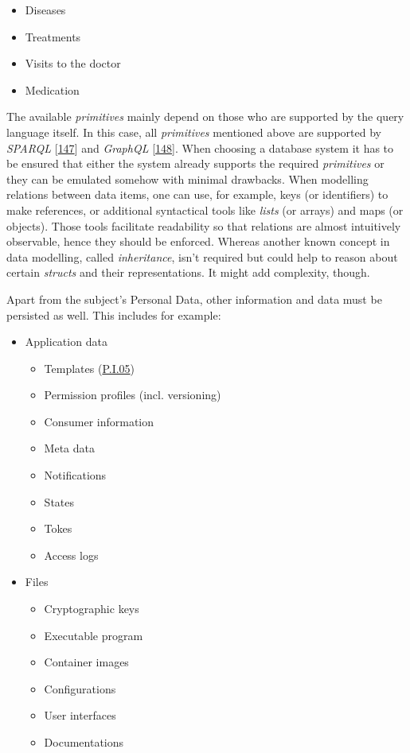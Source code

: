 \documentclass[12pt,english,a4paper,titlepage,cleardoublepage=empty,dottedtoc]{report}
\providecommand{\tightlist}{%
  \setlength{\itemsep}{0pt}\setlength{\parskip}{0pt}}
\begin{document}
\begin{itemize}
  \begin{itemize}
  \tightlist
  \item
    Diseases
  \item
    Treatments
  \item
    Visits to the doctor
  \item
    Medication
  \end{itemize}
\end{itemize}

The available \emph{primitives} mainly depend on those who are supported
by the query language itself. In this case, all \emph{primitives}
mentioned above are supported by \emph{SPARQL}
{[}\protect\hyperlink{ref-web_spec_xml_types}{147}{]} and \emph{GraphQL}
{[}\protect\hyperlink{ref-web_spec_graphql_types}{148}{]}. When choosing
a database system it has to be ensured that either the system already
supports the required \emph{primitives} or they can be emulated somehow
with minimal drawbacks. When modelling relations between data items, one
can use, for example, keys (or identifiers) to make references, or
additional syntactical tools like \emph{lists} (or arrays) and maps (or
objects). Those tools facilitate readability so that relations are
almost intuitively observable, hence they should be enforced. Whereas
another known concept in data modelling, called \emph{inheritance},
isn't required but could help to reason about certain \emph{structs} and
their representations. It might add complexity, though.

Apart from the subject's Personal Data, other information and data must
be persisted as well. This includes for example:

\begin{itemize}
\tightlist
\item
  Application data

  \begin{itemize}
  \tightlist
  \item
    Templates (\protect\hyperlink{pi05}{P.I.05})
  \item
    Permission profiles (incl. versioning)
  \item
    Consumer information
  \item
    Meta data
  \item
    Notifications
  \item
    States
  \item
    Tokes
  \item
    Access logs
  \end{itemize}
\item
  Files

  \begin{itemize}
  \tightlist
  \item
    Cryptographic keys
  \item
    Executable program
  \item
    Container images
  \item
    Configurations
  \item
    User interfaces
  \item
    Documentations
  \end{itemize}
\end{itemize}
\end{document}
